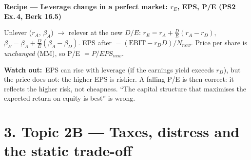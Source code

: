 \documentclass[10pt,a4paper]{article}
\newcommand{\recipe}[1]{\par\smallskip\noindent\textbf{\color{hd}Recipe --- #1}\par}
\newcommand{\watch}{\par\noindent\textbf{\color{wr}Watch out:}~}
\begin{document}
\recipe{Leverage change in a perfect market: $r_E$, EPS, P/E (PS2 Ex.\,4, Berk 16.5)}
Unlever ($r_A$, $\beta_A$) $\to$ relever at the new $D/E$: $r_E=r_A+\frac DE(r_A-r_D)$,
$\beta_E=\beta_A+\frac DE(\beta_A-\beta_D)$. EPS after $=(\text{EBIT}-r_DD)/N_{new}$. Price per share
is \emph{unchanged} (MM), so P/E $=P/EPS_{new}$.
\watch EPS can rise with leverage (if the earnings yield exceeds $r_D$), but the price does not: the
higher EPS is riskier. A falling P/E is then correct: it reflects the higher risk, not cheapness. ``The
capital structure that maximises the expected return on equity is best'' is wrong.

\section*{3. Topic 2B --- Taxes, distress and the static trade-off}
\end{document}
